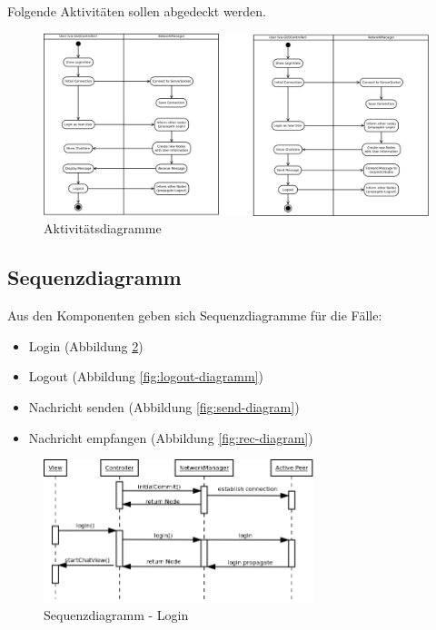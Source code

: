 \documentclass[paper=a4, fontsize=11pt]{scrreprt}
\numberwithin{equation}{section}
\numberwithin{figure}{section}
\numberwithin{table}{section}
\begin{document}
Folgende Aktivitäten sollen abgedeckt werden.

\begin{figure}[!htb] 
  \centering
     \includegraphics[width=1.0\textwidth]{resources/activity-diagram.png}
  \caption{Aktivitätsdiagramme}
  \label{fig:login-diagram}
\end{figure}

\subsection{Sequenzdiagramm}

Aus den Komponenten geben sich Sequenzdiagramme für die Fälle:

\begin{itemize}
    \item Login (Abbildung \ref{fig:login-diagram})
    \item Logout (Abbildung \ref{fig:logout-diagramm})
    \item Nachricht senden (Abbildung \ref{fig:send-diagram})
    \item Nachricht empfangen (Abbildung \ref{fig:rec-diagram})
\end{itemize}

\begin{figure}[!htb] 
  \centering
     \includegraphics[width=0.7\textwidth]{resources/login-sequence.png}
  \caption{Sequenzdiagramm - Login}
  \label{fig:login-diagram}
\end{figure}
\end{document}

